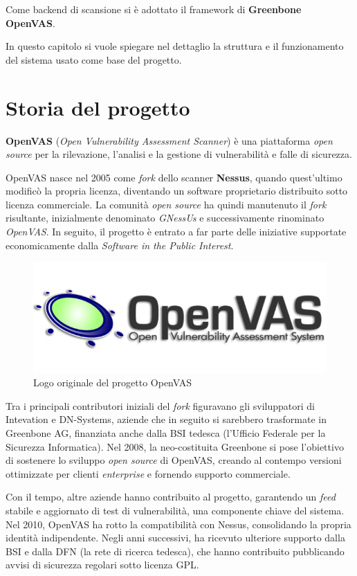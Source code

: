 Come backend di scansione si è adottato il framework di \textbf{Greenbone OpenVAS}.

In questo capitolo si vuole spiegare nel dettaglio la struttura e il funzionamento del sistema usato come base del progetto.

\section{Storia del progetto}
\textbf{OpenVAS} \cite{openvas-scanner} (\emph{Open Vulnerability Assessment Scanner}) è una piattaforma \emph{open source} per la rilevazione, l'analisi e la gestione di vulnerabilità e falle di sicurezza.

OpenVAS nasce nel 2005 come \emph{fork} dello scanner \textbf{Nessus}, quando quest'ultimo modificò la propria licenza, diventando un software proprietario distribuito sotto licenza commerciale. La comunità \emph{open source} ha quindi manutenuto il \emph{fork} risultante, inizialmente denominato \emph{GNessUs} e successivamente rinominato \emph{OpenVAS}. In seguito, il progetto è entrato a far parte delle iniziative supportate economicamente dalla \emph{Software in the Public Interest}.

\begin{figure}[h]
    \centering
    \includegraphics{img/openvas_logo.png}
    \caption{Logo originale del progetto OpenVAS}
\end{figure}

Tra i principali contributori iniziali del \emph{fork} figuravano gli sviluppatori di Intevation e DN-Systems, aziende che in seguito si sarebbero trasformate in Greenbone AG, finanziata anche dalla BSI tedesca (l'Ufficio Federale per la Sicurezza Informatica). Nel 2008, la neo-costituita Greenbone si pose l'obiettivo di sostenere lo sviluppo \emph{open source} di OpenVAS, creando al contempo versioni ottimizzate per clienti \emph{enterprise} e fornendo supporto commerciale.

Con il tempo, altre aziende hanno contribuito al progetto, garantendo un \emph{feed} stabile e aggiornato di test di vulnerabilità, una componente chiave del sistema. Nel 2010, OpenVAS ha rotto la compatibilità con Nessus, consolidando la propria identità indipendente. Negli anni successivi, ha ricevuto ulteriore supporto dalla BSI e dalla DFN (la rete di ricerca tedesca), che hanno contribuito pubblicando avvisi di sicurezza regolari sotto licenza GPL.

